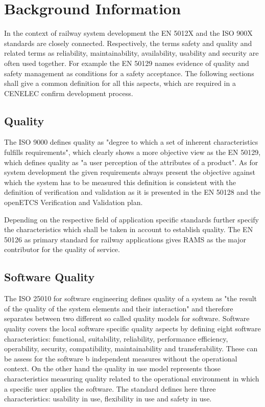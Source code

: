\documentclass{template/openetcs_report}
\begin{document}
\section{Background Information}
\label{sec:Background}

In the context of railway system development the EN 5012X and the ISO 900X standards are closely connected. Respectively, the terms safety and quality and related terms as reliability, maintainability, availability, usability and security are often used together. For example the EN 50129 names evidence of quality and safety management as conditions for a safety acceptance. The following sections shall give a common definition for all this aspects, which are required in a CENELEC confirm development process. 

\subsection{Quality}

The ISO 9000 defines quality as "degree to which a set of inherent characteristics fulfills requirements", which clearly shows a more objective view as the EN 50129, which defines quality as "a user perception of the attributes of a product". As for system development the given requirements always present the objective against which the system has to be measured this definition is consistent with the definition of verification and validation as it is presented in the EN 50128 and the openETCS Verification and Validation plan.

Depending on the respective field of application specific standards further specify the characteristics which shall be taken in account to establish quality. The EN 50126 as primary standard for railway applications gives RAMS as the major contributor for the quality of service. 

\subsection{Software Quality}

The ISO 25010 for software engineering defines quality of a system as "the result of the quality of the system elements and their interaction" and therefore separates between two different so called quality models for software. Software quality covers the local software specific quality aspects by defining eight software characteristics: functional, suitability, reliability, performance efficiency, operability, security, compatibility, maintainability and transferability.
These can be assess for the software b independent measures without the operational  context.
On the other hand the quality in use model represents those characteristics measuring quality related to the operational environment in which a specific user applies the software. The standard defines here three characteristics: 
usability in use, flexibility in use and safety in use.
\end{document}
